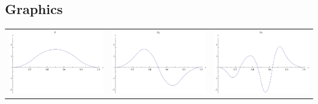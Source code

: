 \documentclass{article}
\begin{document}
\begin{landscape}
\subsection{Graphics}
\begin{tabular}{ccc}
\includegraphics[width=6.7cm]{quadratic_bspline_1.pdf}& \includegraphics[width=6.7cm]{quadratic_bspline_2.pdf}& \includegraphics[width=6.7cm]{quadratic_bspline_3.pdf} \\

\end{tabular}
\end{landscape}
\end{document}
